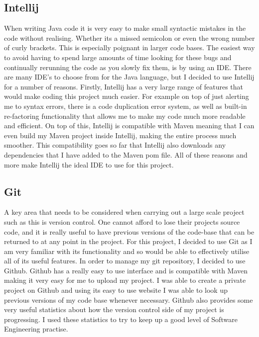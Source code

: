 \subsection{Intellij}

When writing Java code it is very easy to make small syntactic mistakes in the code without realising. Whether its a missed semicolon or even the wrong number of curly brackets. This is especially poignant in larger code bases. The easiest way to avoid having to spend large amounts of time looking for these bugs and continually rerunning the code as you slowly fix them, is by using an IDE. There are many IDE's to choose from for the Java language, but I decided to use Intellij for a number of reasons. Firstly, Intellij has a very large range of features that would make coding this project much easier. For example on top of just alerting me to syntax errors, there is a code duplication error system, as well as built-in re-factoring functionality that allows me to make my code much more readable and efficient. On top of this, Intellij is compatible with Maven meaning that I can even build my Maven project inside Intellij, making the entire process much smoother. This compatibility goes so far that Intellij also downloads any dependencies that I have added to the Maven pom file. All of these reasons and more make Intellij the ideal IDE to use for this project.

\subsection{Git}

A key area that needs to be considered when carrying out a large scale project such as this is version control. One cannot afford to lose their projects source code, and it is really useful to have previous versions of the code-base that can be returned to at any point in the project. For this project, I decided to use Git as I am very familiar with its functionality and so would be able to effectively utilise all of its useful features. In order to manage my git repository, I decided to use Github. Github has a really easy to use interface and is compatible with Maven making it very easy for me to upload my project. I was able to create a private project on Github and using its easy to use website I was able to look up previous versions of my code base whenever necessary. Github also provides some very useful statistics about how the version control side of my project is progressing. I used these statistics to try to keep up a good level of Software Engineering practise.

